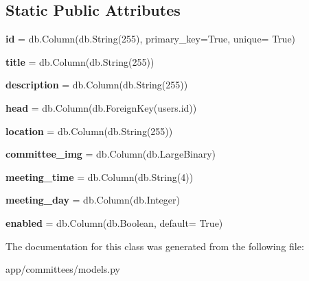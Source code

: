 \subsection*{Static Public Attributes}
\begin{DoxyCompactItemize}
\item 
\mbox{\label{classapp_1_1committees_1_1models_1_1_committees_a3c8aed6bb6326fc3ac1331e650416d69}} 
{\bfseries id} = db.\+Column(db.\+String(255), primary\+\_\+key=True, unique= True)
\item 
\mbox{\label{classapp_1_1committees_1_1models_1_1_committees_a0f6412a1d895d1c00128c7a3cf858854}} 
{\bfseries title} = db.\+Column(db.\+String(255))
\item 
\mbox{\label{classapp_1_1committees_1_1models_1_1_committees_a675ede01d1ee8ccf632ed50c3e02316e}} 
{\bfseries description} = db.\+Column(db.\+String(255))
\item 
\mbox{\label{classapp_1_1committees_1_1models_1_1_committees_aca3664e78077e6605292261f99d3a645}} 
{\bfseries head} = db.\+Column(db.\+Foreign\+Key(\textquotesingle{}users.\+id\textquotesingle{}))
\item 
\mbox{\label{classapp_1_1committees_1_1models_1_1_committees_a84dc8b2bf2e7ea7eb56e6131d536f26e}} 
{\bfseries location} = db.\+Column(db.\+String(255))
\item 
\mbox{\label{classapp_1_1committees_1_1models_1_1_committees_add56310ed392f463e3827ba5d67cd945}} 
{\bfseries committee\+\_\+img} = db.\+Column(db.\+Large\+Binary)
\item 
\mbox{\label{classapp_1_1committees_1_1models_1_1_committees_afe19cf4d32d65902f27b2ee42736bb2a}} 
{\bfseries meeting\+\_\+time} = db.\+Column(db.\+String(4))
\item 
\mbox{\label{classapp_1_1committees_1_1models_1_1_committees_a6c8539a3799bf491d821df4c8aa1ef8f}} 
{\bfseries meeting\+\_\+day} = db.\+Column(db.\+Integer)
\item 
\mbox{\label{classapp_1_1committees_1_1models_1_1_committees_add464a66ef18f66a6129516fb6a507e3}} 
{\bfseries enabled} = db.\+Column(db.\+Boolean, default= True)
\end{DoxyCompactItemize}


The documentation for this class was generated from the following file\+:\begin{DoxyCompactItemize}
\item 
app/committees/models.\+py\end{DoxyCompactItemize}
